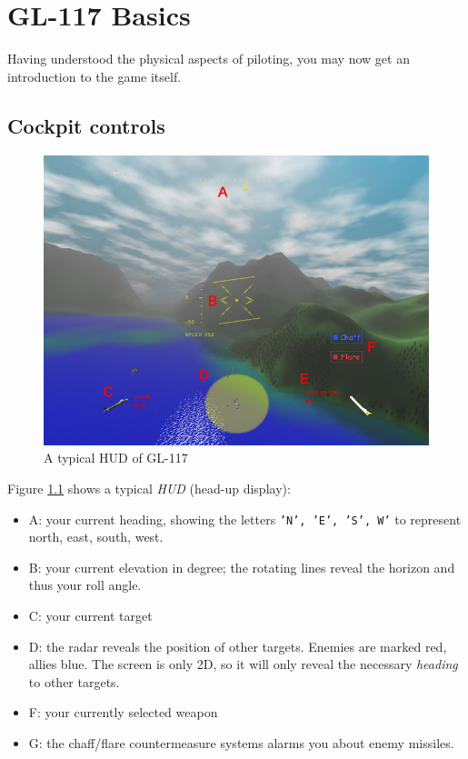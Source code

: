 \chapter{GL-117 Basics}
\label{chap:basics}

Having understood the physical aspects of piloting,
you may now get an introduction to the game itself.


\section{Cockpit controls}
\label{sec:cockpit}

\begin{figure}
\begin{center}
\includegraphics[width=12cm]{hud.jpg}
\caption{A typical HUD of GL-117}
\label{fig:hud}
\end{center}
\end{figure}

Figure \ref{fig:hud} shows a typical \textit{HUD} (head-up display):
\begin{itemize}
\item{A: your current heading, showing the letters \texttt{'N', 'E', 'S', W'}
to represent north, east, south, west.}
\item{B: your current elevation in degree; the rotating lines reveal the
horizon and thus your roll angle.}
\item{C: your current target}
\item{D: the radar reveals the position of other targets. Enemies are marked red,
allies blue. The screen is only 2D, so it will only reveal the necessary \textit{heading} to
other targets.}
\item{F: your currently selected weapon}
\item{G: the chaff/flare countermeasure systems alarms you about enemy missiles.}
\end{itemize}



